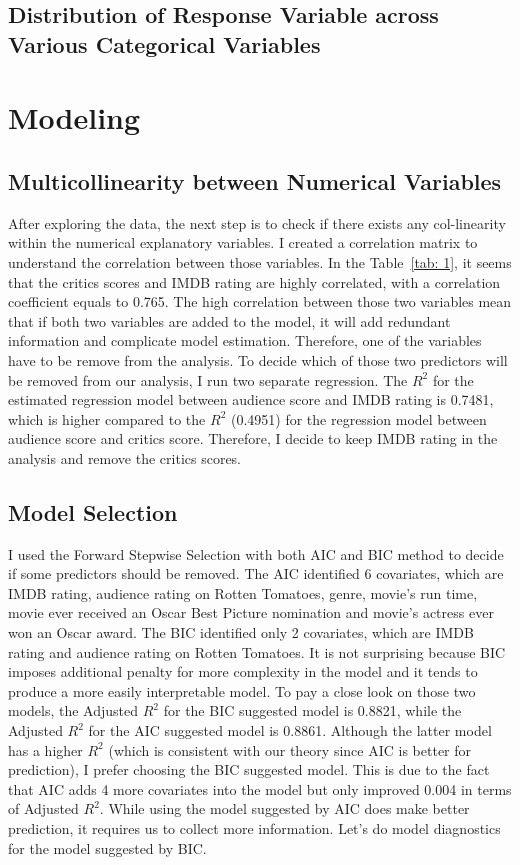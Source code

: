 \documentclass{article}
\begin{document}
\newpage
\subsection{Distribution of Response Variable across Various Categorical Variables}


\newpage
\section{Modeling}
\subsection{Multicollinearity between Numerical Variables}
After exploring the data, the next step is to check if there exists any col-linearity within the numerical explanatory variables. I created a correlation matrix to understand the correlation between those variables. In the Table~\ref{tab: 1}, it seems that the critics scores and IMDB rating are highly correlated, with a correlation coefficient equals to 0.765. The high correlation between those two variables mean that if both two variables are added to the model, it will add redundant information and complicate model estimation. Therefore, one of the variables have to be remove from the analysis. To decide which of those two predictors will be removed from our analysis, I run two separate regression. The $R^2$ for the estimated regression model between audience score and IMDB rating is 0.7481, which is higher compared to the $R^2$ (0.4951) for the regression model between audience score and critics score. Therefore, I decide to keep IMDB rating in the analysis and remove the critics scores.

\subsection{Model Selection}
I used the Forward Stepwise Selection with both AIC and BIC method to decide if some predictors should be removed. The AIC identified 6 covariates, which are IMDB rating, audience rating on Rotten Tomatoes, genre, movie's run time, movie ever received an Oscar Best Picture nomination and movie's actress ever won an Oscar award. The BIC identified only 2 covariates, which are IMDB rating and audience rating on Rotten Tomatoes. It is not surprising because BIC imposes additional penalty for more complexity in the model and it tends to produce a more easily interpretable model. To pay a close look on those two models, the Adjusted $R^2$ for the BIC suggested model is 0.8821, while the Adjusted $R^2$ for the AIC suggested model is 0.8861. Although the latter model has a higher $R^2$ (which is consistent with our theory since AIC is better for prediction), I prefer choosing the BIC suggested model. This is due to the fact that AIC adds 4 more covariates into the model but only improved 0.004 in terms of Adjusted $R^2$. While using the model suggested by AIC does make better prediction, it requires us to collect more information. Let's do model diagnostics for the model suggested by BIC.
\end{document}
